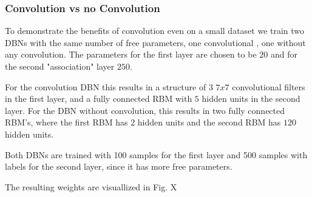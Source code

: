 \subsubsection{Convolution vs no Convolution}

To demonstrate the benefits of convolution even on a small dataset we train two DBNs with the same number of free parameters, one convolutional , one without any convolution.
The parameters for the first layer are chosen to be $20$ and for the second "association" layer $250$.

For the convolution DBN this results in a structure of $3$ $7x7$ convolutional filters in the first layer, and a fully connected RBM with $5$ hidden units in the second layer.
For the DBN without convolution, this results in two fully connected RBM's, where the first RBM has $2$ hidden units and the second RBM has $120$ hidden units.

Both DBNs are trained with 100 samples for the first layer and 500 samples with labels for the second layer, since it has more free parameters.

The resulting weights are visuallized in Fig. X

